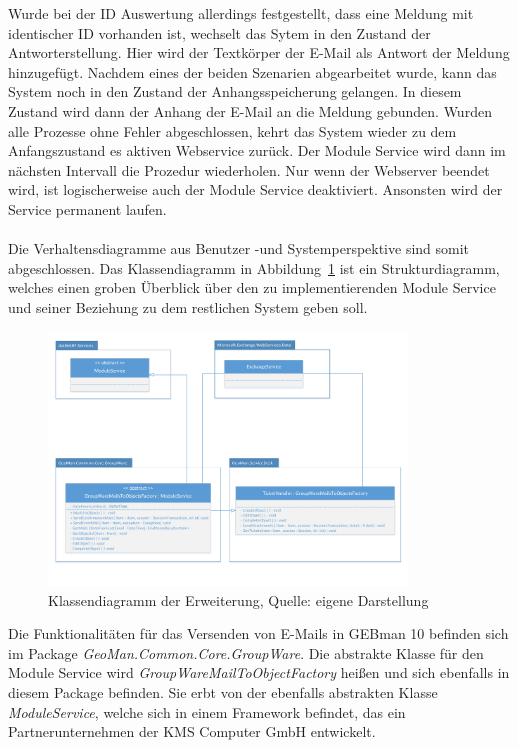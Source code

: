 \noindent
Wurde bei der ID Auswertung allerdings festgestellt, dass eine Meldung mit identischer ID vorhanden ist, wechselt das Sytem in den Zustand der Antworterstellung. Hier wird der Textkörper der E-Mail als Antwort der Meldung hinzugefügt.\newline
Nachdem eines der beiden Szenarien abgearbeitet wurde, kann das System noch in den Zustand der Anhangsspeicherung gelangen. In diesem Zustand wird dann der Anhang der E-Mail an die Meldung gebunden. Wurden alle Prozesse ohne Fehler abgeschlossen, kehrt das System wieder zu dem Anfangszustand es aktiven Webservice zurück. Der Module Service wird dann im nächsten Intervall die Prozedur wiederholen. Nur wenn der Webserver beendet wird, ist logischerweise auch der Module Service deaktiviert. Ansonsten wird der Service permanent laufen.\\\\

\noindent
Die Verhaltensdiagramme aus Benutzer -und Systemperspektive sind somit abgeschlossen. Das Klassendiagramm in Abbildung~\ref{fig:Klassendiagramm} ist ein Strukturdiagramm, welches einen groben Überblick über den zu implementierenden Module Service und seiner Beziehung zu dem restlichen System geben soll. \newpage 

\begin{figure}[h!]
\centering
\includegraphics[width=0.85\textwidth]{Abbildungen/Klassendiagramm.pdf}
	\caption[Klassendiagramm der Erweiterung]{Klassendiagramm der Erweiterung, Quelle: eigene Darstellung}
	\label{fig:Klassendiagramm}
\end{figure}

\noindent
Die Funktionalitäten für das Versenden von E-Mails in GEBman 10 befinden sich im Package \textit{GeoMan.Common.Core.GroupWare}. Die abstrakte Klasse für den Module Service wird \textit{GroupWareMailToObjectFactory} heißen und sich ebenfalls in diesem Package befinden. Sie erbt von der ebenfalls abstrakten Klasse \textit{ModuleService}, welche sich in einem Framework befindet, das ein Partnerunternehmen der KMS Computer GmbH entwickelt.\\ 

